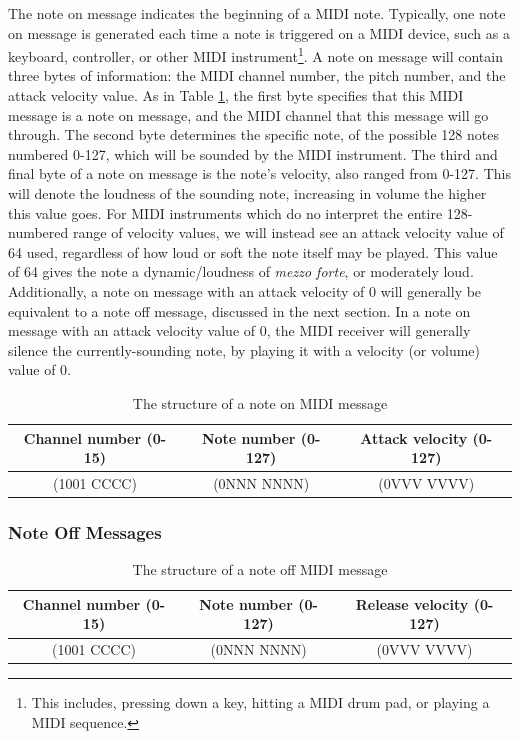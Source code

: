 The note on message indicates the beginning of a MIDI note. Typically, one note on message is generated each time a note is triggered on a MIDI device, such as a keyboard, controller, or other MIDI instrument\footnote{This includes, pressing down a key, hitting a MIDI drum pad, or playing a MIDI sequence.}. A note on message will contain three bytes of information: the MIDI channel number, the pitch number, and the attack velocity value. As in Table \ref{tbl:byte-structure-note-on}, the first byte specifies that this MIDI message is a note on message, and the MIDI channel that this message will go through. The second byte determines the specific note, of the possible 128 notes numbered 0-127, which will be sounded by the MIDI instrument. The third and final byte of a note on message is the note's velocity, also ranged from 0-127. This will denote the loudness of the sounding note, increasing in volume the higher this value goes. For MIDI instruments which do no interpret the entire 128-numbered range of velocity values, we will instead see an attack velocity value of 64 used, regardless of how loud or soft the note itself may be played. This value of 64 gives the note a dynamic/loudness of \textit{mezzo forte}, or moderately loud. Additionally, a note on message with an attack velocity of 0 will generally be equivalent to a note off message, discussed in the next section. In a note on message with an attack velocity value of 0, the MIDI receiver will generally silence the currently-sounding note, by playing it with a velocity (or volume) value of 0\cite{Huber_2012}.

\begin{table}
	\centering
	\begin{tabular}{|c|c|c|}
	\hline
		Channel number (0-15) & Note number (0-127) & Attack velocity (0-127) \\
		\hline
		(1001 CCCC) & (0NNN NNNN) & (0VVV VVVV) \\
	\hline
	\end{tabular}
	\caption{The structure of a note on MIDI message}
	\label{tbl:byte-structure-note-on}
\end{table}

\subsubsection{Note Off Messages}

\begin{table}
	\centering
	\begin{tabular}{|c|c|c|}
	\hline
		Channel number (0-15) & Note number (0-127) & Release velocity (0-127) \\
		\hline
		(1001 CCCC) & (0NNN NNNN) & (0VVV VVVV) \\
	\hline
	\end{tabular}
	\caption{The structure of a note off MIDI message}
	\label{tbl:byte-structure-note-off}
\end{table}

